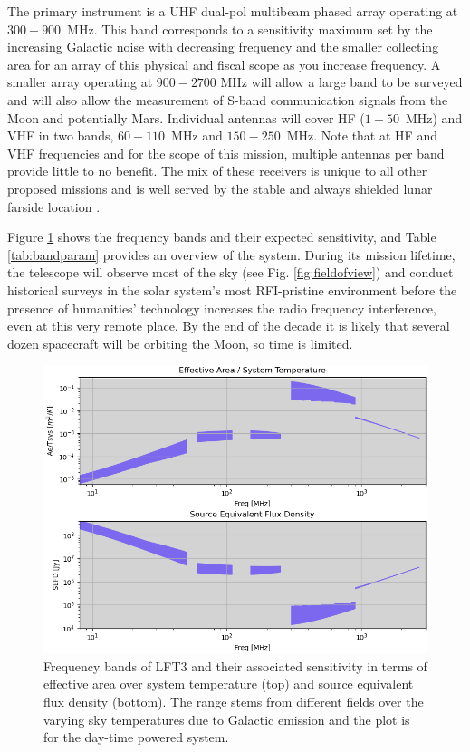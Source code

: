 The primary instrument is a UHF dual-pol multibeam phased array operating at $300-900$~MHz.  This band corresponds to a sensitivity maximum set by the increasing Galactic noise with decreasing frequency and the smaller collecting area for an array of this physical and fiscal scope as you increase frequency.  A smaller array operating at $900-2700$ MHz will allow a large band to be surveyed and will also allow the measurement of S-band communication signals from the Moon and potentially Mars.
Individual antennas will cover HF ($1-50$~MHz) and VHF in two bands, $60-110$~MHz and $150-250$~MHz. Note that at HF and VHF frequencies and for the scope of this mission, multiple antennas per band provide little to no benefit.  The mix of these receivers is unique to all other proposed missions and is well served by the stable and always shielded lunar farside location \citep{2021arXiv210305085B}.

Figure \ref{fig:freqbands} shows the frequency bands and their expected sensitivity, and Table \ref{tab:bandparam} provides an overview of the system.  During its mission lifetime, the telescope will observe most of the sky (see Fig. \ref{fig:fieldofview}) and conduct historical surveys in the solar system's most RFI-pristine environment before the presence of humanities' technology increases the radio frequency interference, even at this very remote place.  By the end of the decade it is likely that several dozen spacecraft will be orbiting the Moon, so time is limited.

\begin{figure}
    \centering
    \includegraphics[width=0.75\linewidth]{figures/freqbands.png}
    \caption{Frequency bands of LFT3 and their associated sensitivity in terms of effective area over system temperature (top) and source equivalent flux density (bottom). The range stems from different fields over the varying sky temperatures due to Galactic emission and the plot is for the day-time powered system.}
    \label{fig:freqbands}
\end{figure}

